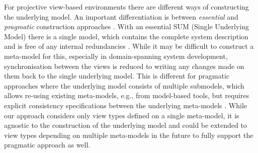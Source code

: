 For projective view-based environments there are different ways of constructing the underlying model.
An important differentiation is between \emph{essential} and \emph{pragmatic} construction approaches \cite{atkinson_fundamental_2015}.
With an essential SUM (Single Underlying Model) there is a single model, which contains the complete system description and is free of any internal redundancies \cite{atkinson_orthographic_2010}.
While it may be difficult to construct a meta-model for this, especially in domain-spanning system development, synchronisation between the views is reduced to writing any changes made on them back to the single underlying model.
This is different for pragmatic approaches where the underlying model consists of multiple submodels, which allows re-using existing meta-models, e.g., from model-based tools, but requires explicit consistency specifications between the underlying meta-models \cite{klare_enabling_2021}.
While our approach considers only view types defined on a single meta-model, it is agnostic to the construction of the underlying model and could be extended to view types depending on multiple meta-models in the future to fully support the pragmatic approach as well.

\begin{comment}
\Textcite{atkinson_fundamental_2015} differentiate between \emph{essential} and \emph{pragmatic} SUMs.
With an essential SUM there is a single model, which contains the complete system description and is free of any internal redundancies.
For the synchronization between the views, this is the easiest solution, because the views are simply required to write any changes made on them back to the SUM.
Subsequently generated views are then automatically consistent.
An example of an approach employing an essential SUM is OSM by \textcite{atkinson_orthographic_2010}.
In contrast to a single redundancy-free model, there are also pragmatic approaches where the underlying model consists of multiple submodels.
The main benefit of pragmatic approaches is the construction of the underlying model.
While it is difficult to create a single redundancy-free \metamodel, especially for a domain-spanning system, pragmatic SUMs allow the integration of already available \metamodels, e.g., from development tools used in the various domains.
Additional effort is, however, necessary to keep the models consistent.
One framework for constructing pragmatic SUMs, here called virtual SUMs (V-SUMs), is Vitruvius \cite{klare_enabling_2021}.
\end{comment}

